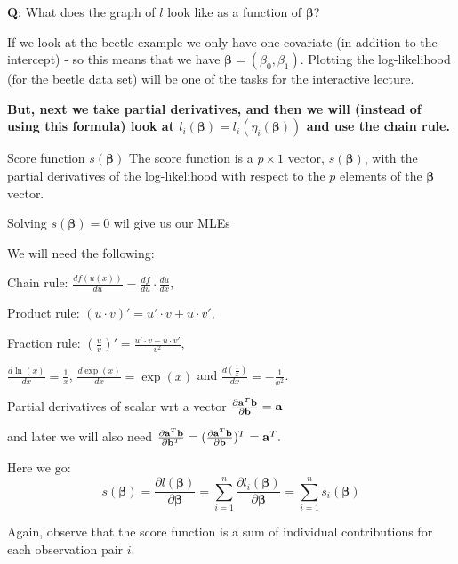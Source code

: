 \documentclass[
  ignorenonframetext,
]{beamer}
\begin{document}
\begin{frame}
\textbf{Q}: What does the graph of \(l\) look like as a function of
\(\boldsymbol{\beta}\)?

If we look at the beetle example we only have one covariate (in addition
to the intercept) - so this means that we have
\(\boldsymbol{\beta}=(\beta_0,\beta_1)\). Plotting the log-likelihood
(for the beetle data set) will be one of the tasks for the interactive
lecture.

\textbf{But, next we take partial derivatives, and then we will (instead
of using this formula) look at
\(l_i(\boldsymbol{\beta})=l_i(\eta_i(\boldsymbol{\beta}))\) and use the
chain rule.}
\end{frame}

\begin{frame}
\begin{block}{Score function \(s(\boldsymbol{\beta})\)}
\label{score-function-sboldsymbolbeta}
The score function is a \(p\times 1\) vector, \(s(\boldsymbol{\beta})\),
with the partial derivatives of the log-likelihood with respect to the
\(p\) elements of the \(\boldsymbol{\beta}\) vector.

Solving \(s(\boldsymbol{\beta})=0\) wil give us our MLEs
\end{block}
\end{frame}

\begin{frame}
We will need the following:

Chain rule: \(\frac{d f(u(x))}{du}=\frac{df}{du}\cdot \frac{du}{dx}\),

Product rule: \((u\cdot v)'=u'\cdot v+u\cdot v'\),

Fraction rule: \((\frac{u}{v})'=\frac{u' \cdot v - u\cdot v'}{v^2}\),

\(\frac{d \ln(x)}{dx}=\frac{1}{x}\), \(\frac{d\exp(x)}{dx}=\exp(x)\) and
\(\frac{d(\frac{1}{x})}{dx}=-\frac{1}{x^2}\).

Partial derivatives of scalar wrt a vector
\(\frac{\partial{\bf a}^T{\bf b}}{\partial {\bf b}}={\bf a}\)

and later we will also need
\(\frac{\partial{\bf a}^T{\bf b}}{\partial {\bf b}^T}=(\frac{\partial{\bf a}^T{\bf b}}{\partial {\bf b}})^T={\bf a}^T.\)
\end{frame}

\begin{frame}
Here we go:
\[s(\boldsymbol{\beta})=\frac{\partial l(\boldsymbol{\beta})}{\partial \boldsymbol{\beta}}=
\sum_{i=1}^n \frac{\partial l_i(\boldsymbol{\beta})}{\partial \boldsymbol{\beta}}=
\sum_{i=1}^n s_i(\boldsymbol{\beta})\]

Again, observe that the score function is a sum of individual
contributions for each observation pair \(i\).
\end{frame}
\end{document}
